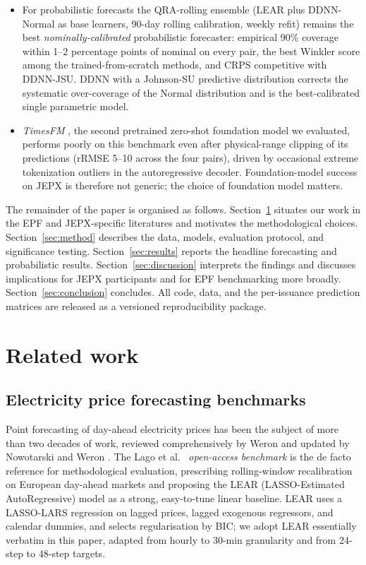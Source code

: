 \documentclass[review,3p,times,authoryear]{elsarticle}
\begin{document}
\begin{itemize}
\item For probabilistic forecasts the QRA-rolling ensemble (LEAR plus DDNN-Normal as base learners, 90-day rolling calibration, weekly refit) remains the best \emph{nominally-calibrated} probabilistic forecaster: empirical 90\% coverage within 1--2 percentage points of nominal on every pair, the best Winkler score among the trained-from-scratch methods, and CRPS competitive with DDNN-JSU. DDNN with a Johnson-SU predictive distribution corrects the systematic over-coverage of the Normal distribution and is the best-calibrated single parametric model.
\item \emph{TimesFM} \citep{das2024timesfm}, the second pretrained zero-shot foundation model we evaluated, performs poorly on this benchmark even after physical-range clipping of its predictions (rRMSE 5--10 across the four pairs), driven by occasional extreme tokenization outliers in the autoregressive decoder. Foundation-model success on JEPX is therefore not generic; the choice of foundation model matters.
\end{itemize}

The remainder of the paper is organised as follows. Section~\ref{sec:relwork} situates our work in the EPF and JEPX-specific literatures and motivates the methodological choices. Section~\ref{sec:method} describes the data, models, evaluation protocol, and significance testing. Section~\ref{sec:results} reports the headline forecasting and probabilistic results. Section~\ref{sec:discussion} interprets the findings and discusses implications for JEPX participants and for EPF benchmarking more broadly. Section~\ref{sec:conclusion} concludes. All code, data, and the per-issuance prediction matrices are released as a versioned reproducibility package.

\section{Related work}\label{sec:relwork}

\subsection{Electricity price forecasting benchmarks}
Point forecasting of day-ahead electricity prices has been the subject of more than two decades of work, reviewed comprehensively by Weron \citep{weron2014} and updated by Nowotarski and Weron \citep{nowotarski2018}. The Lago et al.\ \citep{lago2021} \emph{open-access benchmark} is the de facto reference for methodological evaluation, prescribing rolling-window recalibration on European day-ahead markets and proposing the LEAR (LASSO-Estimated AutoRegressive) model as a strong, easy-to-tune linear baseline. LEAR uses a LASSO-LARS regression on lagged prices, lagged exogenous regressors, and calendar dummies, and selects regularisation by BIC; we adopt LEAR essentially verbatim in this paper, adapted from hourly to 30-min granularity and from 24-step to 48-step targets.
\end{document}
